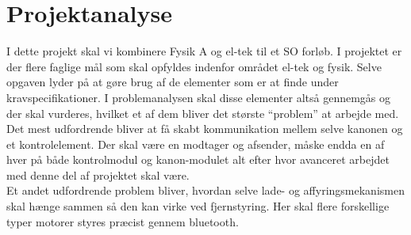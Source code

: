 \section{Projektanalyse}

I dette projekt skal vi kombinere Fysik A og el-tek til et SO forløb. I projektet er der flere faglige mål som skal opfyldes indenfor området el-tek og fysik. Selve opgaven lyder på at gøre brug af de elementer som er at finde under kravspecifikationer. I problemanalysen skal disse elementer altså gennemgås og der skal vurderes, hvilket et af dem bliver det største “problem” at arbejde med.\\

Det mest udfordrende bliver at få skabt kommunikation mellem selve kanonen og et kontrolelement. Der skal være en modtager og afsender, måske endda en af hver på både kontrolmodul og kanon-modulet alt efter hvor avanceret arbejdet med denne del af projektet skal være.\\

Et andet udfordrende problem bliver, hvordan selve lade- og affyringsmekanismen skal hænge sammen så den kan virke ved fjernstyring. Her skal flere forskellige typer motorer styres præcist gennem bluetooth.
